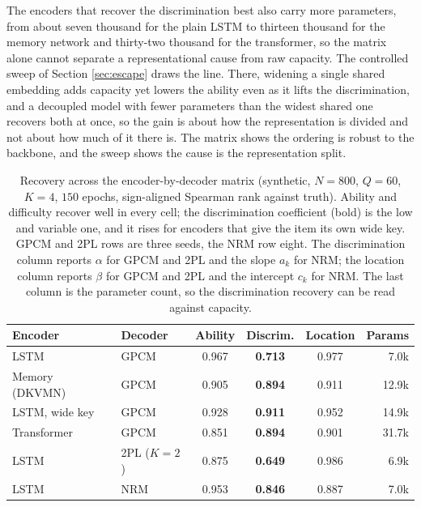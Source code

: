 \documentclass[sigconf,nonacm,screen]{acmart}
\begin{document}
The encoders that recover the discrimination best also carry more parameters, from
about seven thousand for the plain LSTM to thirteen thousand for the memory network
and thirty-two thousand for the transformer, so the matrix alone cannot separate a
representational cause from raw capacity. The controlled sweep of Section
\ref{sec:escape} draws the line. There, widening a single shared embedding adds
capacity yet lowers the ability even as it lifts the discrimination, and a decoupled
model with fewer parameters than the widest shared one recovers both at once, so the
gain is about how the representation is divided and not about how much of it there
is. The matrix shows the ordering is robust to the backbone, and the sweep shows the
cause is the representation split.

\begin{table}[t]
\caption{Recovery across the encoder-by-decoder matrix (synthetic, $N=800$,
$Q=60$, $K=4$, $150$ epochs, sign-aligned Spearman rank against truth). Ability and
difficulty recover well in every cell; the discrimination coefficient (bold) is the
low and variable one, and it rises for encoders that give the item its own wide
key. GPCM and 2PL rows are three seeds, the NRM row eight. The discrimination
column reports $\alpha$ for GPCM and 2PL and the slope $a_k$ for NRM; the location
column reports $\beta$ for GPCM and 2PL and the intercept $c_k$ for NRM. The last
column is the parameter count, so the discrimination recovery can be read against
capacity.}
\label{tab:matrix}
\small
\begin{tabular}{@{}llcccr@{}}
\toprule
Encoder & Decoder & Ability & \textbf{Discrim.} & Location & Params \\
\midrule
LSTM              & GPCM & 0.967 & \textbf{0.713} & 0.977 & 7.0k \\
Memory (DKVMN)    & GPCM & 0.905 & \textbf{0.894} & 0.911 & 12.9k \\
LSTM, wide key    & GPCM & 0.928 & \textbf{0.911} & 0.952 & 14.9k \\
Transformer       & GPCM & 0.851 & \textbf{0.894} & 0.901 & 31.7k \\
\midrule
LSTM              & 2PL ($K{=}2$) & 0.875 & \textbf{0.649} & 0.986 & 6.9k \\
LSTM              & NRM  & 0.953 & \textbf{0.846} & 0.887 & 7.0k \\
\bottomrule
\end{tabular}
\end{table}
\end{document}
